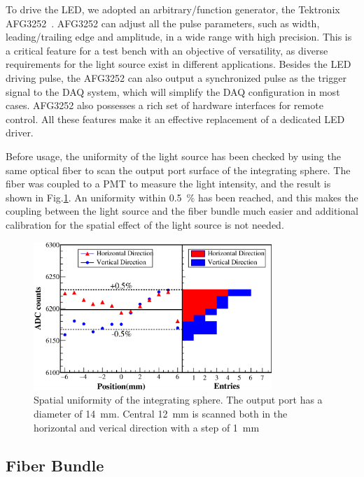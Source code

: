 \documentclass[5p, times]{elsarticle}
\begin{document}
To drive the LED, we adopted an arbitrary/function generator, the Tektronix AFG3252~\cite{afg3252}. AFG3252 can adjust all the pulse parameters, such as width, leading/trailing edge and amplitude, in a wide range with high precision. This is a critical feature for a test bench with an objective of versatility, as diverse requirements for the light source exist in different applications. 
Besides the LED driving pulse, the AFG3252 can also output a synchronized pulse as the trigger signal to the DAQ system, which will simplify the DAQ configuration in most cases. 
AFG3252 also possesses a rich set of hardware interfaces for remote control. All these features make it an effective replacement of a dedicated LED driver. 

Before usage, the uniformity of the light source has been checked by using the same optical fiber to scan the output port surface of the integrating sphere. The fiber was coupled to a PMT to measure the light intensity, and the result is shown in Fig.\ref{fig:uniformity_integratingsphere}. An uniformity within \textpm\SI{0.5}{\percent} has been reached, and this makes the coupling between the light source and the fiber bundle much easier and additional calibration for the spatial effect of the light source is not needed. 

\begin{figure}
 \centering
 \includegraphics[width=90mm]{uniformity_integratingsphere}
\caption{Spatial uniformity of the integrating sphere.
The output port has a diameter of \SI{14}{\milli\meter}.
Central \SI{12}{\milli\meter} is scanned both in the horizontal and verical direction with a step of \SI{1}{\milli\meter}}
\label{fig:uniformity_integratingsphere}
\end{figure} 

\subsection{Fiber Bundle}
\label{sec:fiber_bundle}
\end{document}
